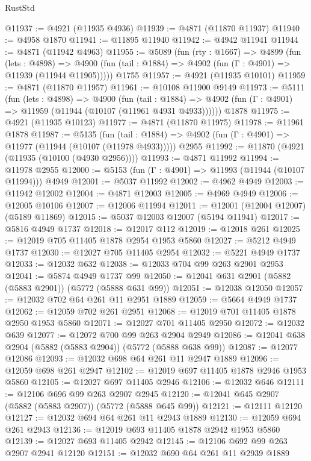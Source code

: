 \begin{lexlean}{RustStd}
\begin{coremodule}
@11937 := @4921 (@11935 @4936)
@11939 := @4871 (@11870 @11937)
@11940 := @4958 @1870
@11941 := @11895 @11940
@11942 := @4942 @11941
@11944 := @4871 (@11942 @4963)
@11955 := @5089
    (fun (rty : @1667) =>
    @4899
      (fun (lets : @4898) =>
      @4900 (fun (tail : @1884) => @4902 (fun (Γ : @4901) => @11939 (@11944 @11905)))))
    @1755
@11957 := @4921 (@11935 @10101)
@11959 := @4871 (@11870 @11957)
@11961 := @10108 @11900 @9149
@11973 := @5111
    (fun (lets : @4898) =>
    @4900
      (fun (tail : @1884) =>
      @4902 (fun (Γ : @4901) => @11959 (@11944 (@10107 (@11961 @4931 @4933))))))
    @1878
@11975 := @4921 (@11935 @10123)
@11977 := @4871 (@11870 @11975)
@11978 := @11961 @1878
@11987 := @5135
    (fun (tail : @1884) => @4902 (fun (Γ : @4901) => @11977 (@11944 (@10107 (@11978 @4933)))))
    @2955
@11992 := @11870 (@4921 (@11935 (@10100 (@4930 @2956))))
@11993 := @4871 @11992
@11994 := @11978 @2955
@12000 := @5153 (fun (Γ : @4901) => @11993 (@11944 (@10107 @11994))) @4949
@12001 := @5037 @11992
@12002 := @4962 @4949
@12003 := @11942 @12002
@12004 := @4871 @12003
@12005 := @4969 @4949
@12006 := @12005 @10106
@12007 := @12006 @11994
@12011 := @12001 (@12004 @12007) (@5189 @11869)
@12015 := @5037 @12003 @12007 (@5194 @11941)
@12017 := @5816 @4949 @1737
@12018 := @12017 @112
@12019 := @12018 @261
@12025 := @12019 @705 @11405 @1878 @2954 @1953 @5860
@12027 := @5212 @4949 @1737
@12030 := @12027 @705 @11405 @2954
@12032 := @5221 @4949 @1737
@12033 := @12032 @632
@12038 := @12033 @704 @99 @263 @2901 @2953
@12041 := @5874 @4949 @1737 @99
@12050 := @12041 @631 @2901 (@5882 (@5883 @2901)) (@5772 (@5888 @631 @99))
@12051 := @12038 @12050
@12057 := @12032 @702 @64 @261 @11 @2951 @1889
@12059 := @5664 @4949 @1737
@12062 := @12059 @702 @261 @2951
@12068 := @12019 @701 @11405 @1878 @2950 @1953 @5860
@12071 := @12027 @701 @11405 @2950
@12072 := @12032 @639
@12077 := @12072 @700 @99 @263 @2904 @2949
@12086 := @12041 @638 @2904 (@5882 (@5883 @2904)) (@5772 (@5888 @638 @99))
@12087 := @12077 @12086
@12093 := @12032 @698 @64 @261 @11 @2947 @1889
@12096 := @12059 @698 @261 @2947
@12102 := @12019 @697 @11405 @1878 @2946 @1953 @5860
@12105 := @12027 @697 @11405 @2946
@12106 := @12032 @646
@12111 := @12106 @696 @99 @263 @2907 @2945
@12120 := @12041 @645 @2907 (@5882 (@5883 @2907)) (@5772 (@5888 @645 @99))
@12121 := @12111 @12120
@12127 := @12032 @694 @64 @261 @11 @2943 @1889
@12130 := @12059 @694 @261 @2943
@12136 := @12019 @693 @11405 @1878 @2942 @1953 @5860
@12139 := @12027 @693 @11405 @2942
@12145 := @12106 @692 @99 @263 @2907 @2941 @12120
@12151 := @12032 @690 @64 @261 @11 @2939 @1889

\end{coremodule}
\end{lexlean}
